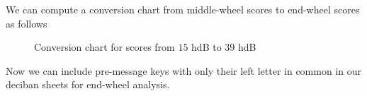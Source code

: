   \noindent We can compute a conversion chart from middle-wheel
  scores to end-wheel scores as follows
  \begin{figure}[H]
    \begin{center}
    \end{center}
    \caption{Conversion chart for scores from $15$ hdB to $39$ hdB}
  \end{figure}
  \noindent Now we can include pre-message keys with only their left
  letter in common in our deciban sheets for end-wheel analysis.
